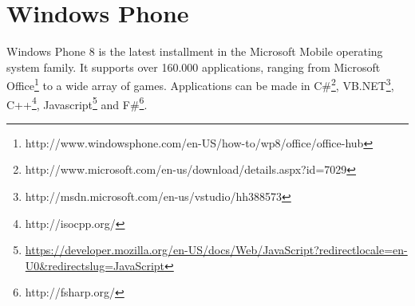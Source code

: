 \section{Windows Phone}
Windows Phone 8 is the latest installment in the Microsoft Mobile operating system family. It supports over 160.000 applications, ranging from Microsoft Office\footnote{http://www.windowsphone.com/en-US/how-to/wp8/office/office-hub} to a wide array of games.
Applications can be made in C\#\footnote{http://www.microsoft.com/en-us/download/details.aspx?id=7029}, VB.NET\footnote{http://msdn.microsoft.com/en-us/vstudio/hh388573}, C++\footnote{http://isocpp.org/}, Javascript\footnote{\url{https://developer.mozilla.org/en-US/docs/Web/JavaScript?redirectlocale=en-U0\&redirectslug=JavaScript}} and F\#\footnote{http://fsharp.org/}.
